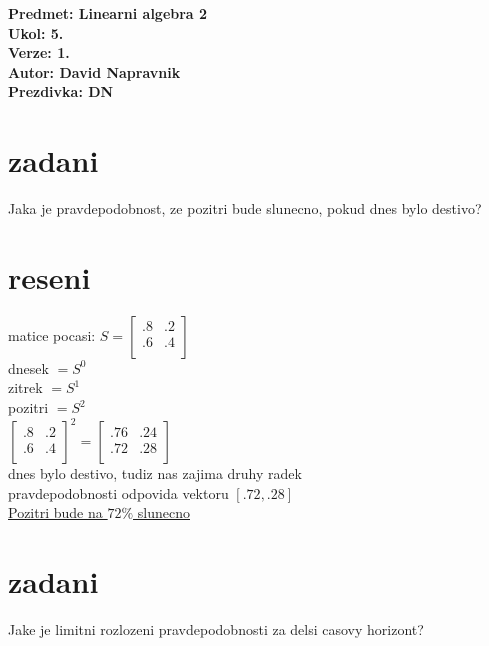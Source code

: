 \documentclass[a4paper]{article}
\def\doubleunderline#1{\underline{\underline{#1}}}
\begin{document}
\noindent
\textbf{Predmet: Linearni algebra 2}\\
\textbf{Ukol: 5.}\\
\textbf{Verze: 1.}\\
\textbf{Autor: David Napravnik}\\
\textbf{Prezdivka: DN}

\section*{zadani}
Jaka je pravdepodobnost, ze pozitri bude slunecno, pokud dnes bylo destivo?

\section*{reseni}
matice pocasi: $
S=
\begin{bmatrix}
	.8 & .2\\
	.6 & .4\\
\end{bmatrix}
$\\
dnesek $=S^0$\\
zitrek $=S^1$\\
pozitri $=S^2$\\
$
\begin{bmatrix}
	.8 & .2\\
	.6 & .4\\
\end{bmatrix}^2
=
\begin{bmatrix}
	.76 & .24\\
	.72 & .28\\
\end{bmatrix}
$\\
dnes bylo destivo, tudiz nas zajima druhy radek\\
pravdepodobnosti odpovida vektoru $[.72, .28]$\\
\doubleunderline{Pozitri bude na $72\%$ slunecno}






\section*{zadani}
Jake je limitni rozlozeni pravdepodobnosti za delsi casovy horizont?
\end{document}

